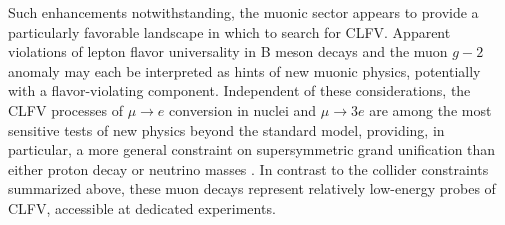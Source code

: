 \documentclass{book}[letterpaper,12pt]
\begin{document}
Such enhancements notwithstanding, the muonic sector appears to provide a particularly favorable landscape in which to search for CLFV. Apparent violations of lepton flavor universality in B meson decays and the muon $g-2$ anomaly may each be interpreted as hints of new muonic physics, potentially with a flavor-violating component. Independent of these considerations, the CLFV processes of $\mu\rightarrow e$ conversion in nuclei and $\mu\rightarrow 3e$ are among the most sensitive tests of new physics beyond the standard model, providing, in particular, a more general constraint on supersymmetric grand unification than either proton decay or neutrino masses \cite{Barbieri_1994}.  In contrast to the collider constraints summarized above, these muon decays represent relatively low-energy probes of CLFV, accessible at dedicated experiments.
\end{document}
